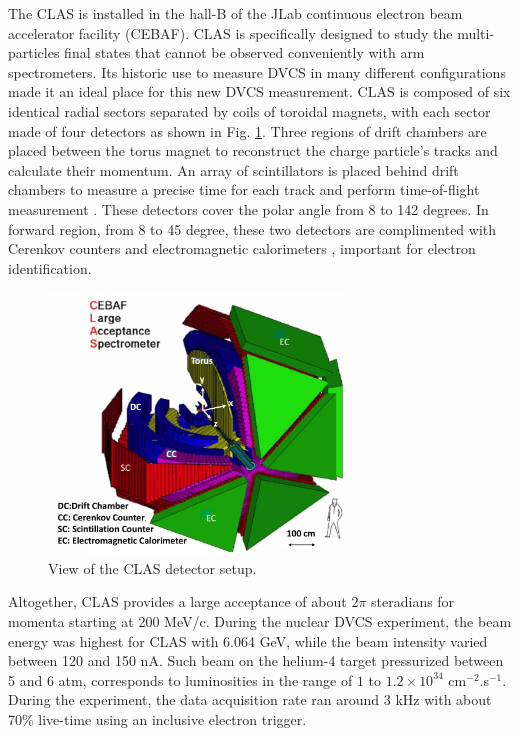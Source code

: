 \documentclass{article}
\begin{document}
The CLAS \cite{Mecking:2003zu} is installed in the hall-B of the JLab continuous electron beam 
accelerator facility (CEBAF). CLAS is specifically designed to study the multi-particles final states
that cannot be observed conveniently with arm spectrometers. Its historic use to measure DVCS in many different 
configurations made it an ideal place for this new DVCS measurement. CLAS is composed of six identical radial 
sectors separated by coils of toroidal magnets, with each sector made of four detectors 
as shown in Fig. \ref{fig:CLAS}.  Three regions of drift chambers \cite{Mestayer:2000we} 
are placed between the torus magnet to reconstruct the charge particle's tracks and 
calculate their momentum. An array of scintillators is placed behind drift chambers to measure 
a precise time for each track and perform time-of-flight measurement 
\cite{Smith:1999ii}. These detectors cover the polar angle from 8 to 142 degrees. 
In forward region, from 8 to 45 degree, these two detectors are complimented with 
Cerenkov counters \cite{Adams:2001kk} and electromagnetic calorimeters \cite{Amarian:2001zs},
important for electron identification. 

\begin{figure}[tbp!]
\center
\includegraphics[width=8cm]{fig3/CLAS_geantview-PS.jpg}
	\caption{View of the CLAS detector setup.}
\label{fig:CLAS}
\end{figure}


Altogether, CLAS provides a large acceptance of about $2\pi$ steradians for momenta 
starting at 200 MeV/c. During the nuclear DVCS experiment,
the beam energy was highest for CLAS with 6.064 GeV, while the beam intensity varied
between 120 and 150 nA. Such beam on the helium-4 target pressurized between 5 and 6 atm,
corresponds to luminosities in the range of $1$ to $1.2 \times 10^{34}$ cm$^{-2}$.s$^{-1}$.
During the experiment, the data acquisition rate ran around 3 kHz with about 70\% live-time
using an inclusive electron trigger. 
\end{document}
